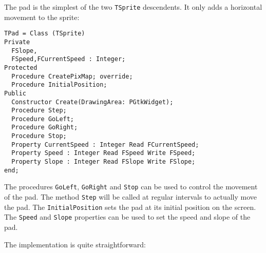 \documentclass[10pt]{article}
\newcommand{\var}[1]{\texttt{#1}}
\begin{document}
The pad is the simplest of the two \var{TSprite} descendents. It only adds a
horizontal movement to the sprite:
\begin{verbatim}
TPad = Class (TSprite)
Private
  FSlope,
  FSpeed,FCurrentSpeed : Integer;
Protected
  Procedure CreatePixMap; override;
  Procedure InitialPosition; 
Public  
  Constructor Create(DrawingArea: PGtkWidget);
  Procedure Step;
  Procedure GoLeft;
  Procedure GoRight;
  Procedure Stop;
  Property CurrentSpeed : Integer Read FCurrentSpeed;
  Property Speed : Integer Read FSpeed Write FSpeed;
  Property Slope : Integer Read FSlope Write FSlope;
end;
\end{verbatim}
The procedures \var{GoLeft}, \var{GoRight} and \var{Stop} can be used to
control the movement of the pad. The method \var{Step} will be called at
regular intervals to actually move the pad. The \var{InitialPosition} 
sets the pad at its initial position on the screen. The \var{Speed} and 
\var{Slope} properties can be used to set the speed and slope of the pad.

The implementation is quite straightforward:
\begin{verbatim}
\end{verbatim}
\end{document}
